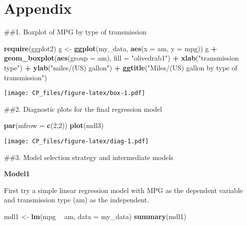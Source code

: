 \documentclass[
]{article}
\newenvironment{Shaded}{\begin{snugshade}}{\end{snugshade}}
\newcommand{\DataTypeTok}[1]{\textcolor[rgb]{0.13,0.29,0.53}{#1}}
\newcommand{\DecValTok}[1]{\textcolor[rgb]{0.00,0.00,0.81}{#1}}
\newcommand{\KeywordTok}[1]{\textcolor[rgb]{0.13,0.29,0.53}{\textbf{#1}}}
\newcommand{\NormalTok}[1]{#1}
\newcommand{\OperatorTok}[1]{\textcolor[rgb]{0.81,0.36,0.00}{\textbf{#1}}}
\newcommand{\StringTok}[1]{\textcolor[rgb]{0.31,0.60,0.02}{#1}}
\begin{document}
\newpage

\hypertarget{appendix}{%
\section{Appendix}\label{appendix}}

\#\#1. Boxplot of MPG by type of transmission

\begin{Shaded}
\begin{Highlighting}[]
\KeywordTok{require}\NormalTok{(ggplot2)}
\NormalTok{g <-}\StringTok{ }\KeywordTok{ggplot}\NormalTok{(my_data, }\KeywordTok{aes}\NormalTok{(}\DataTypeTok{x =}\NormalTok{ am, }\DataTypeTok{y =}\NormalTok{ mpg))}
\NormalTok{g }\OperatorTok{+}\StringTok{ }\KeywordTok{geom_boxplot}\NormalTok{(}\KeywordTok{aes}\NormalTok{(}\DataTypeTok{group =}\NormalTok{ am), }\DataTypeTok{fill =} \StringTok{"olivedrab1"}\NormalTok{) }\OperatorTok{+}
\StringTok{        }\KeywordTok{xlab}\NormalTok{(}\StringTok{"transmission type"}\NormalTok{) }\OperatorTok{+}
\StringTok{        }\KeywordTok{ylab}\NormalTok{(}\StringTok{"miles/(US) gallon"}\NormalTok{) }\OperatorTok{+}
\StringTok{        }\KeywordTok{ggtitle}\NormalTok{(}\StringTok{"Miles/(US) gallon by type of transmission"}\NormalTok{)}
\end{Highlighting}
\end{Shaded}

\texttt{[image: CP\_files/figure-latex/box-1.pdf]}

\#\#2. Diagnostic plots for the final regression model

\begin{Shaded}
\begin{Highlighting}[]
\KeywordTok{par}\NormalTok{(}\DataTypeTok{mfrow =} \KeywordTok{c}\NormalTok{(}\DecValTok{2}\NormalTok{,}\DecValTok{2}\NormalTok{))}
\KeywordTok{plot}\NormalTok{(mdl3)}
\end{Highlighting}
\end{Shaded}

\texttt{[image: CP\_files/figure-latex/diag-1.pdf]}

\#\#3. Model selection strategy and intermediate models

\textbf{Model1}

First try a simple linear regression model with MPG as the dependent
variable and transmission type (am) as the independent.

\begin{Shaded}
\begin{Highlighting}[]
\NormalTok{mdl1 <-}\StringTok{ }\KeywordTok{lm}\NormalTok{(mpg }\OperatorTok{~}\StringTok{ }\NormalTok{am, }\DataTypeTok{data =}\NormalTok{ my_data)}
\KeywordTok{summary}\NormalTok{(mdl1)}
\end{Highlighting}
\end{Shaded}
\end{document}
